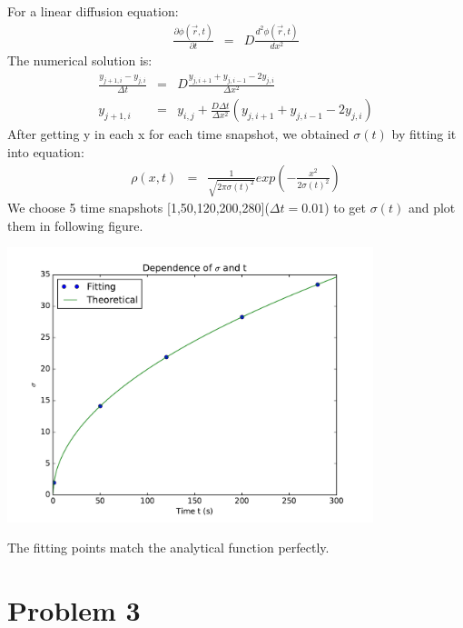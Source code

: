 \documentclass{article}
\begin{document}
For a linear diffusion equation:
\begin{eqnarray}
  \nonumber \frac{\partial\phi(\vec r, t)}{\partial t} &=& D\frac{d^2\phi(\vec r, t)}{dx^2}
\end{eqnarray}
\quad The numerical solution is:
\begin{eqnarray}
  \nonumber \frac{y_{j+1, i}-y_{j, i}}{\Delta t} &=& D\frac{y_{j, i+1}+y_{j, i-1}-2y_{j, i}}{\Delta x^2} \\
  \nonumber y_{j+1, i} &=& y_{i, j}+\frac{D\Delta t}{\Delta x^2}(y_{j, i+1}+y_{j, i-1}-2y_{j, i})
\end{eqnarray}
\quad After getting y in each x for each time snapshot, we obtained $\sigma(t)$ by fitting it into equation:
\begin{eqnarray}
  \nonumber \rho(x,t) &=& \frac{1}{\sqrt{2\pi \sigma(t)^2}}exp\left(-\frac{x^2}{2\sigma (t)^2}\right)
\end{eqnarray}
\quad We choose 5 time snapshots [1,50,120,200,280]($\Delta t=0.01$) to get $\sigma(t)$ and plot them in following figure.
\begin{center}
\includegraphics[width=0.8\textwidth]{./sigma.pdf}
\end{center}
\quad The fitting points match the analytical function perfectly.
\section{Problem 3}
\end{document}
